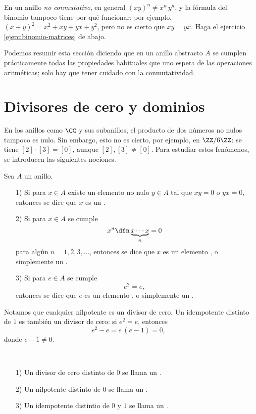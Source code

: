 En un anillo \emph{no conmutativo}, en general $(xy)^n \ne x^n\,y^n$,
y la fórmula del binomio tampoco tiene por qué funcionar: por ejemplo,
$(x+y)^2 = x^2 + xy + yx + y^2$, pero no es cierto que $xy = yx$.
Haga el ejercicio \ref{ejerc:binomio-matrices} de abajo.

Podemos resumir esta sección diciendo que en un anillo abstracto $A$ se cumplen
prácticamente todas las propiedades habituales que uno espera de las operaciones
aritméticas; solo hay que tener cuidado con la conmutatividad.


\section{Divisores de cero y dominios}

En los anillos como $\CC$ y sus subanillos, el producto de dos números no nulos
tampoco es nulo. Sin embargo, esto no es cierto, por ejemplo, en $\ZZ/6\ZZ$:
se tiene $[2]\cdot [3] = [0]$, aunque $[2], [3] \ne [0]$. Para estudiar estos
fenómenos, se introducen las siguientes nociones.

\begin{definicion}
  Sea $A$ un anillo.

  \begin{enumerate}
  \item[1)] Si para $x\in A$ existe un elemento no nulo $y \in A$ tal que
    $xy = 0$ o $yx = 0$, entonces se dice que $x$ es un .

  \item[2)] Si para $x\in A$ se cumple
    $$x^n \dfn \underbrace{x\cdots x}_n = 0$$
    para algún $n = 1,2,3,\ldots$, entonces se dice que $x$ es un elemento
    , o simplemente un .

  \item[3)] Si para $e\in A$ se cumple
    $$e^2 = e,$$
    entonces se dice que $e$ es un elemento , o simplemente un
    .
  \end{enumerate}
\end{definicion}

Notamos que cualquier nilpotente es un divisor de cero. Un idempotente distinto
de $1$ es también un divisor de cero: si $e^2 = e$, entonces
$$e^2 - e = e\,(e-1) = 0,$$
donde $e - 1 \ne 0$.

\begin{definicion}
  ~

  \begin{enumerate}
  \item[1)] Un divisor de cero distinto de $0$ se llama un
    .

  \item[2)] Un nilpotente distinto de $0$ se llama un
    .

  \item[3)] Un idempotente distintio de $0$ y $1$ se llama un
    .
  \end{enumerate}
\end{definicion}


